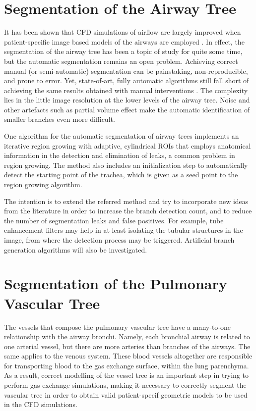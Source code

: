 \section{Segmentation of the Airway Tree}

\challenge

It has been shown that CFD simulations of airflow are largely improved when patient-specific image based models of the airways are employed \citep{Tawhai2010,Vial2005}. In effect, the segmentation of the airway tree has been a topic of study for quite some time, but the automatic segmentation remains an open problem. Achieving correct manual (or semi-automatic) segmentation can be painstaking, non-reproducible, and prone to error. Yet, state-of-art, fully automatic algorithms still fall short of achieving the same results obtained with manual interventions \citep{Lo}. The complexity lies in the little image resolution at the lower levels of the airway tree. Noise and other artefacts such as partial volume effect make the automatic identification of smaller branches even more difficult.

\approach

One algorithm for the automatic segmentation of airway trees \citep{Pinho:Airways2} implements an iterative region growing with adaptive, cylindrical ROIs that employs anatomical information in the detection and elimination of leaks, a common problem in region growing. The method also includes an initialization step to automatically detect the starting point of the trachea, which is given as a seed point to the region growing algorithm. 

The intention is to extend the referred method and try to incorporate new ideas from the literature \citep{Lo} in order to increase the branch detection count, and to reduce the number of segmentation leaks and false positives. For example, tube enhancement filters \citep{ORLO-09} may help in at least isolating the tubular structures in the image, from where the detection process may be triggered. Artificial branch generation algorithms \citep{Tawhai2000} will also be investigated.

\section{Segmentation of the Pulmonary Vascular Tree}

\challenge

The vessels that compose the pulmonary vascular tree have a many-to-one relationship with the airway bronchi. Namely, each bronchial airway is related to one arterial vessel, but there are more arteries than branches of the airways. The same applies to the venous system. These blood vessels altogether are responsible for transporting blood to the gas exchange surface, within the lung parenchyma. As a result, correct modelling of the vessel tree is an important step in trying to perform gas exchange simulations, making it necessary to correctly segment the vascular tree in order to obtain valid patient-specif geometric models to be used in the CFD simulations. 

